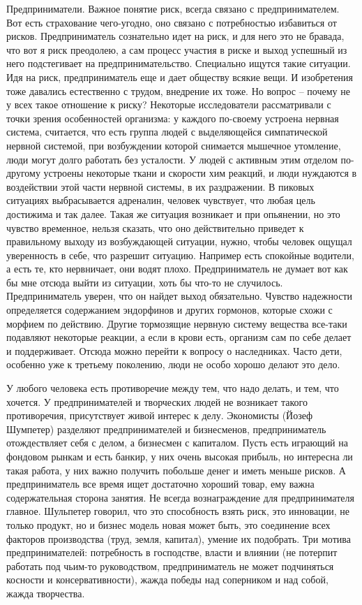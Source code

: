 \documentclass[a4paper, 12pt]{article}
\begin{document}
Предприниматели. Важное понятие риск, всегда связано с предпринимателем. Вот есть страхование чего-угодно, оно связано с потребностью избавиться от рисков. Предприниматель сознательно идет на риск, и для него это не бравада, что вот я риск преодолею, а сам процесс участия в риске и выход успешный из него подстегивает на предпринимательство. Специально ищутся такие ситуации. Идя на риск, предприниматель еще и дает обществу всякие вещи. И изобретения тоже давались естественно с трудом, внедрение их тоже. Но вопрос -- почему не у всех такое отношение к риску? Некоторые исследователи рассматривали с точки зрения особенностей организма: у каждого по-своему устроена нервная система, считается, что есть группа людей с выделяющейся симпатической нервной системой, при возбуждении которой снимается мышечное утомление, люди могут долго работать без усталости. У людей с активным этим отделом по-другому устроены некоторые ткани и скорости хим реакций, и люди нуждаются в воздействии этой части нервной системы, в их раздражении. В пиковых ситуациях выбрасывается адреналин, человек чувствует, что любая цель достижима и так далее. Такая же ситуация возникает и при опьянении, но это чувство временное, нельзя сказать, что оно действительно приведет к правильному выходу из возбуждающей ситуации, нужно, чтобы человек ощущал уверенность в себе, что разрешит ситуацию. Например есть спокойные водители, а есть те, кто нервничает, они водят плохо. Предприниматель не думает вот как бы мне отсюда выйти из ситуации, хоть бы что-то не случилось. Предприниматель уверен, что он найдет выход обязательно. Чувство надежности определяется содержанием эндорфинов и других гормонов, которые схожи с морфием по действию. Другие тормозящие нервную систему вещества все-таки подавляют некоторые реакции, а если в крови есть, организм сам по себе делает и поддерживает. Отсюда можно перейти к вопросу о наследниках. Часто дети, особенно уже к третьему поколению, люди не особо хорошо делают это дело. 

У любого человека есть противоречие между тем, что надо делать, и тем, что хочется. У предпринимателей и творческих людей не возникает такого противоречия, присутствует живой интерес к делу. Экономисты (Йозеф Шумпетер) разделяют предпринимателей и бизнесменов, предприниматель отождествляет себя с делом, а бизнесмен с капиталом. Пусть есть играющий на фондовом рынкам и есть банкир, у них очень высокая прибыль, но интересна ли такая работа, у них важно получить побольше денег и иметь меньше рисков. А предприниматель все время ищет достаточно хороший товар, ему важна содержательная сторона занятия. Не всегда вознаграждение для предпринимателя главное. Шульпетер говорил, что это способность взять риск, это инновации, не только продукт, но и бизнес модель новая может быть, это соединение всех факторов производства (труд, земля, капитал), умение их подобрать. Три мотива предпринимателей: потребность в господстве, власти и влиянии (не потерпит работать под чьим-то руководством, предприниматель не может подчиняться косности и консервативности), жажда победы над соперником и над собой, жажда творчества. 
\end{document}
